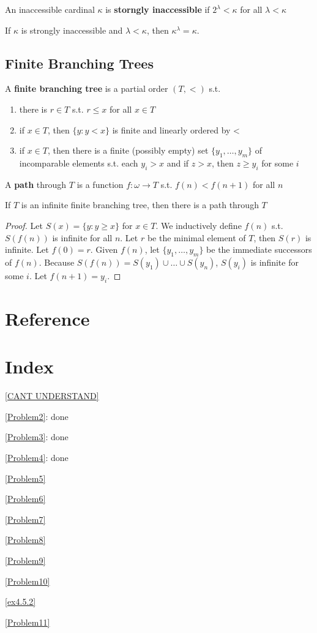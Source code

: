 \documentclass[11pt]{article}
\begin{document}
An inaccessible cardinal \(\kappa\) is \textbf{storngly inaccessible} if \(2^\lambda<\kappa\) for all \(\lambda<\kappa\)

\begin{corollary}[]
If \(\kappa\) is strongly inaccessible and \(\lambda<\kappa\), then \(\kappa^\lambda=\kappa\).
\end{corollary}
\subsection{Finite Branching Trees}
\label{sec:org78369e2}
\begin{definition}[]
A \textbf{finite branching tree} is a partial order \((T,<)\) s.t.
\begin{enumerate}
\item there is \(r\in T\) s.t. \(r\le x\) for all \(x\in T\)
\item if \(x\in T\), then \(\{y:y<x\}\) is finite and linearly ordered by <
\item if \(x\in T\), then there is a finite (possibly empty) set \(\{y_1,\dots,y_m\}\) of incomparable
elements s.t. each \(y_i>x\) and if \(z>x\), then \(z\ge y_i\) for some \(i\)
\end{enumerate}
\end{definition}

A \textbf{path} through \(T\) is a function \(f:\omega\to T\) s.t. \(f(n)<f(n+1)\) for all \(n\)

\begin{lemma}
\label{lemmaA.21}
If \(T\) is an infinite finite branching tree, then there is a path through \(T\)
\end{lemma}

\begin{proof}
Let \(S(x)=\{y:y\ge x\}\) for \(x\in T\). We inductively define \(f(n)\) s.t. \(S(f(n))\) is infinite
for all \(n\). Let \(r\) be the minimal element of \(T\), then \(S(r)\) is infinite.
Let \(f(0)=r\). Given \(f(n)\), let \(\{y_1,\dots,y_m\}\) be the immediate successors of \(f(n)\).
Because \(S(f(n))=S(y_1)\cup\dots\cup S(y_n)\), \(S(y_i)\) is infinite for some \(i\). Let \(f(n+1)=y_i\).
\end{proof}
\section{Reference}
\label{sec:org35dccc1}


\section{Index}
\label{sec:org26fdb23}
\renewcommand{\indexname}{}
\printindex
\appendix
\ref{CANT UNDERSTAND}


\ref{Problem2}: done


\ref{Problem3}: done


\ref{Problem4}: done


\ref{Problem5}

\ref{Problem6}

\ref{Problem7}

\ref{Problem8}

\ref{Problem9}

\ref{Problem10}

\ref{ex4.5.2}

\ref{Problem11}
\end{document}
